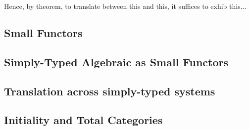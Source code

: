 Hence, by theorem, to translate between this and this, it suffices to exhib this...



\subsection{Small Functors}

\subsection{Simply-Typed Algebraic as Small Functors}

\subsection{Translation across simply-typed systems}

\subsection{Initiality and Total Categories}

